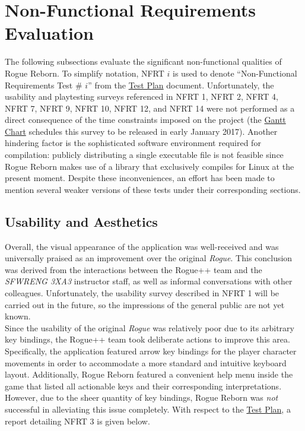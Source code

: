 \documentclass[12pt, titlepage]{article}
\newcommand{\newsection}[1]{
  \newpage
  \section{#1}
}
\newcommand{\nfrt}[1]{
	NFRT #1
}
\begin{document}
\newsection{Non-Functional Requirements Evaluation} \label{Section_NFR_Evaluation}
	The following subsections evaluate the significant non-functional qualities of Rogue Reborn.  To simplify notation, \nfrt{$i$} is used to denote ``Non-Functional Requirements Test \# $i$'' from the \href{run:../TestPlan/TestPlan.pdf}{Test Plan} document.  Unfortunately, the usability and playtesting surveys referenced in NFRT 1, NFRT 2, NFRT 4, NFRT 7, NFRT 9, NFRT 10, NFRT 12, and NFRT 14 were not performed as a direct consequence of the time constraints imposed on the project (the \href{run:../../ProjectSchedule/rogue.gan}{Gantt Chart} schedules this survey to be released in early January 2017).  Another hindering factor is the sophisticated software environment required for compilation: publicly distributing a single executable file is not feasible since Rogue Reborn makes use of a library that exclusively compiles for Linux at the present moment.  Despite these inconveniences, an effort has been made to mention several weaker versions of these tests under their corresponding sections.

	\subsection{Usability and Aesthetics}
		Overall, the visual appearance of the application was well-received and was universally praised as an improvement over the original \textit{Rogue}.  This conclusion was derived from the interactions between the Rogue++ team and the \textit{SFWRENG 3XA3} instructor staff, as well as informal conversations with other colleagues.  Unfortunately, the usability survey described in NFRT 1 will be carried out in the future, so the impressions of the general public are not yet known.\\

		Since the usability of the original \textit{Rogue} was relatively poor due to its arbitrary key bindings, the Rogue++ team took deliberate actions to improve this area.  Specifically, the application featured arrow key bindings for the player character movements in order to accommodate a more standard and intuitive keyboard layout.  Additionally, Rogue Reborn featured a convenient help menu inside the game that listed all actionable keys and their corresponding interpretations.  However, due to the sheer quantity of key bindings, Rogue Reborn was \textit{not} successful in alleviating this issue completely.  With respect to the \href{run:../TestPlan/TestPlan.pdf}{Test Plan}, a report detailing NFRT 3 is given below.
\end{document}
